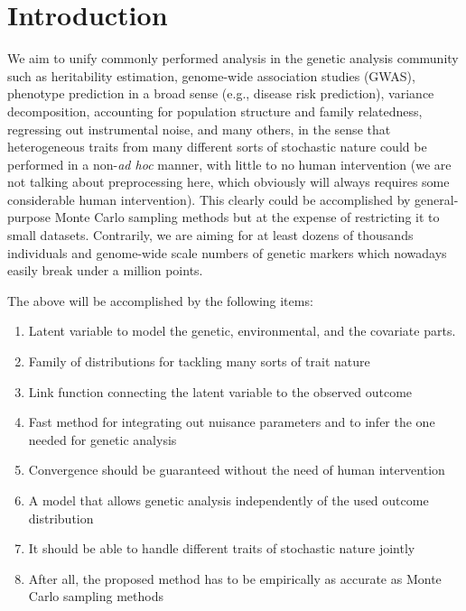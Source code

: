 \section{Introduction}

We aim to unify commonly performed analysis in the genetic analysis community
such as heritability estimation, genome-wide association studies (GWAS),
phenotype prediction in a broad sense (e.g., disease risk prediction), variance
decomposition, accounting for population structure and family relatedness, regressing
out instrumental noise, and many others, in the sense that heterogeneous traits
from many different sorts of stochastic nature could be performed in a
non-\textit{ad hoc} manner, with little to no human intervention (we are not
talking about preprocessing here, which obviously will always requires some
considerable human intervention). This clearly could be accomplished by
general-purpose Monte Carlo sampling methods but at the expense of restricting
it to small datasets. Contrarily, we are aiming for at least dozens of thousands
individuals and genome-wide scale numbers of genetic markers which nowadays
easily break under a million points.

The above will be accomplished by the following items:

\begin{enumerate}
  \item Latent variable to model the genetic, environmental, and the covariate parts.
  \item Family of distributions for tackling many sorts of trait nature
  \item Link function connecting the latent variable to the observed outcome
  \item Fast method for integrating out nuisance parameters and to infer the one needed for genetic analysis
  \item Convergence should be guaranteed without the need of human intervention
  \item A model that allows genetic analysis independently of the used outcome distribution
  \item It should be able to handle different traits of stochastic nature jointly
  \item After all, the proposed method has to be empirically as accurate as Monte Carlo sampling methods
\end{enumerate}
